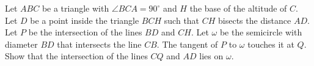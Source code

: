 Let $ABC$ be a triangle with $\angle BCA = 90^\circ$ and $H$ the base of the altitude of $C$. Let $D$ be a point inside the triangle $BCH$ such that $CH$ bisects the distance $AD$. Let $P$ be the intersection of the lines $BD$ and $CH$. Let $\omega$ be the semicircle with diameter $BD$ that intersects the line $CB$. The tangent of $P$ to $\omega$ touches it at $Q$. Show that the intersection of the lines $CQ$ and $AD$ lies on $\omega$.